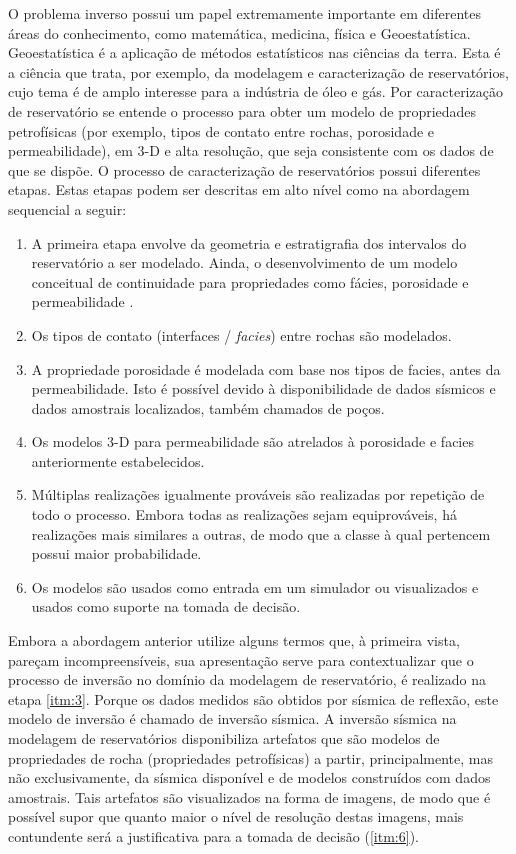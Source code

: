 O problema inverso possui um papel extremamente importante em diferentes áreas do conhecimento,
como matemática, medicina, física e Geoestatística. Geoestatística é a aplicação de métodos
estatísticos nas ciências da terra. Esta é a ciência que trata, por exemplo, da modelagem
e caracterização de reservatórios, cujo tema é de amplo interesse para a indústria de óleo
e gás. Por caracterização de reservatório se entende o processo para obter um modelo de propriedades
petrofísicas (por exemplo, tipos de contato entre rochas, porosidade e permeabilidade),
em 3-D e alta resolução, que seja consistente com os dados de que se dispõe.
O processo de caracterização de reservatórios possui diferentes
etapas. Estas etapas podem ser descritas em alto nível como na
abordagem sequencial a seguir:
\begin{enumerate}
 \item A primeira etapa envolve da geometria e estratigrafia dos intervalos do reservatório
 a ser modelado. Ainda, o desenvolvimento de um modelo conceitual de continuidade para
 propriedades como fácies, porosidade e permeabilidade \label{itm:1}.
 \item Os tipos de contato (interfaces / \textit{facies}) entre rochas são modelados\label{itm:2}.
 \item A propriedade porosidade é modelada com base nos tipos de facies, antes da permeabilidade.
 Isto é possível devido à disponibilidade de dados sísmicos e dados amostrais localizados, também chamados de poços\label{itm:3}.
 \item Os modelos 3-D para permeabilidade são atrelados à porosidade e facies anteriormente estabelecidos\label{itm:4}.
 \item Múltiplas realizações igualmente prováveis são realizadas por repetição de todo o processo. Embora todas as
 realizações sejam equiprováveis, há realizações mais similares a outras, de modo que a classe à qual pertencem possui
 maior probabilidade\label{itm:5}.
 \item Os modelos são usados como entrada em um simulador ou visualizados e usados como suporte na tomada de decisão\label{itm:6}.
\end{enumerate}

Embora a abordagem anterior utilize alguns termos que, à primeira vista, pareçam incompreensíveis, sua apresentação 
serve para contextualizar que o processo de inversão no domínio da modelagem de reservatório,
é realizado na etapa \ref{itm:3}. Porque os dados medidos são obtidos por sísmica de reflexão,
este modelo de inversão é chamado de inversão sísmica. A inversão sísmica na
modelagem de reservatórios disponibiliza artefatos que são modelos de propriedades de rocha
(propriedades petrofísicas) a partir, principalmente, mas não exclusivamente,
da sísmica disponível e de modelos construídos com dados amostrais. Tais artefatos
são visualizados na forma de imagens, de modo que é possível supor que quanto maior
o nível de resolução destas imagens, mais contundente será a justificativa para a tomada de decisão (\ref{itm:6}).

